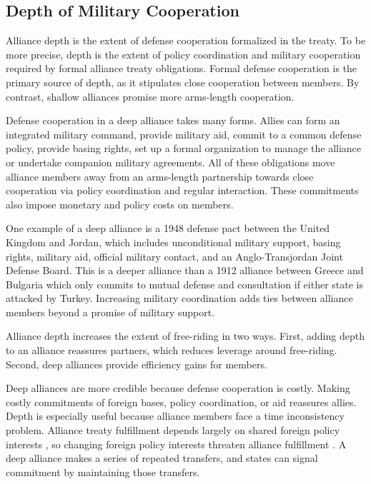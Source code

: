 \documentclass[12pt]{article}
\begin{document}
\subsection{Depth of Military Cooperation} 


Alliance depth is the extent of defense cooperation formalized in the treaty. 
To be more precise, depth is the extent of policy coordination and military cooperation required by formal alliance treaty obligations. 
Formal defense cooperation is the primary source of depth, as it stipulates close cooperation between members.
By contrast, shallow alliances promise more arms-length cooperation. 


Defense cooperation in a deep alliance takes many forms. 
Allies can form an integrated military command, provide military aid, commit to a common defense policy, provide basing rights, set up a formal organization to manage the alliance or undertake companion military agreements. 
All of these obligations move alliance members away from an arms-length partnership towards close cooperation via policy coordination and regular interaction. 
These commitments also impose monetary and policy costs on members. 

 
One example of a deep alliance is a 1948 defense pact between the United Kingdom and Jordan, which includes unconditional military support, basing rights, military aid, official military contact, and an Anglo-Transjordan Joint Defense Board.  
This is a deeper alliance than a 1912 alliance between Greece and Bulgaria which only commits to mutual defense and consultation if either state is attacked by Turkey. 
Increasing military coordination adds ties between alliance members beyond a promise of military support.


Alliance depth increases the extent of free-riding in two ways. 
First, adding depth to an alliance reassures partners, which reduces leverage around free-riding.  
Second, deep alliances provide efficiency gains for members. 

Deep alliances are more credible because defense cooperation is costly. 
Making costly commitments of foreign bases, policy coordination, or aid reassures allies. 
Depth is especially useful because alliance members face a time inconsistency problem. 
Alliance treaty fulfillment depends largely on shared foreign policy interests \citep{Morrow2000, Leeds2003a}, so changing foreign policy interests threaten alliance fulfillment \citep{LeedsSavun2007}. 
A deep alliance makes a series of repeated transfers, and states can signal commitment by maintaining those transfers.  
\end{document}

